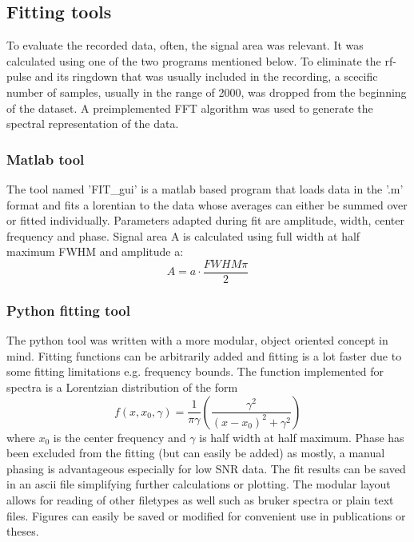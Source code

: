         \subsection{Fitting tools}
            To evaluate the recorded data, often, the signal area was relevant. It was calculated using one of the two programs mentioned below. To eliminate the rf-pulse and its ringdown that was usually included in the recording, a scecific number of samples, usually in the range of 2000, was dropped from the beginning of the dataset. A preimplemented FFT algorithm was used to generate the spectral representation of the data.
            \subsubsection{Matlab tool}
            The tool named 'FIT\_gui' is a matlab based program that loads data in the '.m' format and fits a lorentian to the data whose averages can either be summed over or fitted individually. Parameters adapted during fit are amplitude, width, center frequency and phase. Signal area A is calculated using full width at half maximum FWHM and amplitude a:
            \begin{equation}
                A=a\cdot\frac{FWHM\pi}{2}
            \end{equation}
            \subsubsection{Python fitting tool}
            The python tool was written with a more modular, object oriented concept in mind. Fitting functions can be arbitrarily added and fitting is a lot faster due to some fitting limitations e.g. frequency bounds. The function implemented for spectra is a Lorentzian distribution of the form
            \begin{equation}
                f(x,x_0, \gamma) = \frac{1}{\pi\gamma}\left(\frac{\gamma^2}{(x-x_0)^2+\gamma^2}\right)
            \end{equation}
            where $x_0$ is the center frequency and $\gamma$ is half width at half maximum.
            Phase has been excluded from the fitting (but can easily be added) as mostly, a manual phasing is advantageous especially for low SNR data. The fit results can be saved in an ascii file simplifying further calculations or plotting.
            The modular layout allows for reading of other filetypes as well such as bruker spectra or plain text files.
            Figures can easily be saved or modified for convenient use in publications or theses.
